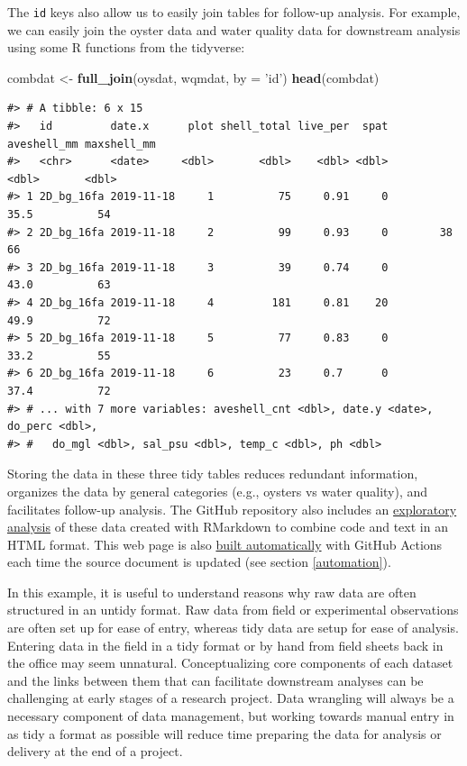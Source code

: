 \documentclass[
]{book}
\newenvironment{Shaded}{\begin{snugshade}}{\end{snugshade}}
\newcommand{\DataTypeTok}[1]{\textcolor[rgb]{0.13,0.29,0.53}{#1}}
\newcommand{\KeywordTok}[1]{\textcolor[rgb]{0.13,0.29,0.53}{\textbf{#1}}}
\newcommand{\NormalTok}[1]{#1}
\newcommand{\StringTok}[1]{\textcolor[rgb]{0.31,0.60,0.02}{#1}}
\begin{document}
The \texttt{id} keys also allow us to easily join tables for follow-up analysis. For example, we can easily join the oyster data and water quality data for downstream analysis using some R functions from the tidyverse:

\begin{Shaded}
\begin{Highlighting}[]
\NormalTok{combdat <-}\StringTok{ }\KeywordTok{full_join}\NormalTok{(oysdat, wqmdat, }\DataTypeTok{by =} \StringTok{'id'}\NormalTok{)}
\KeywordTok{head}\NormalTok{(combdat)}
\end{Highlighting}
\end{Shaded}

\begin{verbatim}
#> # A tibble: 6 x 15
#>   id         date.x      plot shell_total live_per  spat aveshell_mm maxshell_mm
#>   <chr>      <date>     <dbl>       <dbl>    <dbl> <dbl>       <dbl>       <dbl>
#> 1 2D_bg_16fa 2019-11-18     1          75     0.91     0        35.5          54
#> 2 2D_bg_16fa 2019-11-18     2          99     0.93     0        38            66
#> 3 2D_bg_16fa 2019-11-18     3          39     0.74     0        43.0          63
#> 4 2D_bg_16fa 2019-11-18     4         181     0.81    20        49.9          72
#> 5 2D_bg_16fa 2019-11-18     5          77     0.83     0        33.2          55
#> 6 2D_bg_16fa 2019-11-18     6          23     0.7      0        37.4          72
#> # ... with 7 more variables: aveshell_cnt <dbl>, date.y <date>, do_perc <dbl>,
#> #   do_mgl <dbl>, sal_psu <dbl>, temp_c <dbl>, ph <dbl>
\end{verbatim}

Storing the data in these three tidy tables reduces redundant information, organizes the data by general categories (e.g., oysters vs water quality), and facilitates follow-up analysis. The GitHub repository also includes an \href{https://tbep-tech.github.io/tberf-oyster/figures.html}{exploratory analysis} of these data created with RMarkdown \citep{Xie18} to combine code and text in an HTML format. This web page is also \href{https://github.com/tbep-tech/tberf-oyster/actions}{built automatically} with GitHub Actions each time the source document is updated (see section \ref{automation}).

In this example, it is useful to understand reasons why raw data are often structured in an untidy format. Raw data from field or experimental observations are often set up for ease of entry, whereas tidy data are setup for ease of analysis. Entering data in the field in a tidy format or by hand from field sheets back in the office may seem unnatural. Conceptualizing core components of each dataset and the links between them that can facilitate downstream analyses can be challenging at early stages of a research project. Data wrangling will always be a necessary component of data management, but working towards manual entry in as tidy a format as possible will reduce time preparing the data for analysis or delivery at the end of a project.
\end{document}
